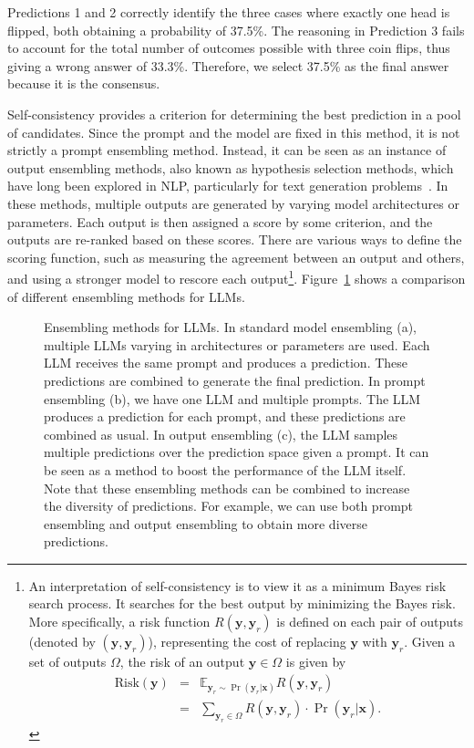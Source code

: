 Predictions 1 and 2 correctly identify the three cases where exactly one head is flipped, both obtaining a probability of 37.5\%. The reasoning in Prediction 3 fails to account for the total number of outcomes possible with three coin flips, thus giving a wrong answer of 33.3\%. Therefore, we select 37.5\% as the final answer because it is the consensus.

Self-consistency provides a criterion for determining the best prediction in a pool of candidates. Since the prompt and the model are fixed in this method, it is not strictly a prompt ensembling method. Instead, it can be seen as an instance of output ensembling methods, also known as hypothesis selection methods, which have long been explored in NLP, particularly for text generation problems~\cite{xiao-etal:2013bagging}. In these methods, multiple outputs are generated by varying model architectures or parameters. Each output is then assigned a score by some criterion, and the outputs are re-ranked based on these scores. There are various ways to define the scoring function, such as measuring the agreement between an output and others, and using a stronger model to rescore each output\footnote{An interpretation of self-consistency is to view it as a minimum Bayes risk search process. It searches for the best output by minimizing the Bayes risk. More specifically, a risk function $R(\mathbf{y},\mathbf{y}_r)$ is defined on each pair of outputs (denoted by $(\mathbf{y},\mathbf{y}_r)$), representing the cost of replacing $\mathbf{y}$ with $\mathbf{y}_r$. Given a set of outputs $\varOmega$, the risk of an output $\mathbf{y} \in \varOmega$ is given by
\begin{eqnarray}
\mathrm{Risk}(\mathbf{y}) & = & \mathbb{E}_{\mathbf{y}_r \sim \Pr(\mathbf{y}_r|\mathbf{x})} R(\mathbf{y},\mathbf{y}_r) \nonumber \\
                          & = & \sum_{\mathbf{y}_r \in \varOmega} R(\mathbf{y},\mathbf{y}_r) \cdot \Pr(\mathbf{y}_r|\mathbf{x}).
\end{eqnarray}

}. Figure~\ref{fig:llm-ensembling-comparison} shows a comparison of different ensembling methods for LLMs.

\begin{figure}[!t]
\centering

\caption{Ensembling methods for LLMs. In standard model ensembling (a), multiple LLMs varying in architectures or parameters are used. Each LLM receives the same prompt and produces a prediction. These predictions are combined to generate the final prediction. In prompt ensembling (b), we have one LLM and multiple prompts. The LLM produces a prediction for each prompt, and these predictions are combined as usual. In output ensembling (c), the LLM samples multiple predictions over the prediction space given a prompt. It can be seen as a method to boost the performance of the LLM itself. Note that these ensembling methods can be combined to increase the diversity of predictions. For example, we can use both prompt ensembling and output ensembling to obtain more diverse predictions.}
\label{fig:llm-ensembling-comparison}
\end{figure}

